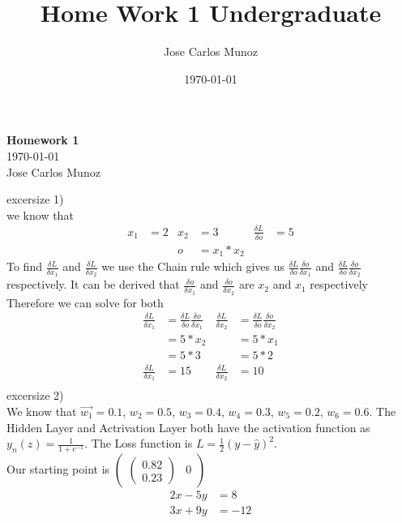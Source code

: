 \documentclass[12pt,english]{article}
\title{Home Work 1 Undergraduate}
\date{\today}
\author{Jose Carlos Munoz}
\begin{document}
\begin{center}
    \Large
    \textbf{Homework 1}\\
    \small
    \today\\
    \large
    Jose Carlos Munoz
\end{center}
excersize 1)\\
we know that
\begin{align*}
x_1&=2 & x_2&= 3 & \frac{\delta L}{\delta o}&=5\\
     &     & o   &= x_1 * x_2 
\end{align*}
To find $\frac{\delta L}{\delta x_1}$ and $\frac{\delta L}{\delta x_2}$ we use the Chain rule which gives us $\frac{\delta L}{\delta o}\frac{\delta o}{\delta x_1}$ and $\frac{\delta L}{\delta o}\frac{\delta o}{\delta x_2}$ respectively. It can be derived that $\frac{\delta o}{\delta x_1}$ and $\frac{\delta o}{\delta x_2}$ are $x_2$ and $x_1$ respectively\\
Therefore we can solve for both\\
\begin{align*}
\frac{\delta L}{\delta x_1}&=\frac{\delta L}{\delta o}\frac{\delta o}{\delta x_1} & \frac{\delta L}{\delta x_2}&=\frac{\delta L}{\delta o}\frac{\delta o}{\delta x_2}\\
                                      &=5*x_2  &  &=5 *x_1\\
                                      &=5*3  &  &=5 *2\\
\frac{\delta L}{\delta x_1}&=15  &  \frac{\delta L}{\delta x_2}&=10\\
\end{align*}
excersize 2)\\
We know that $\vec{w_1} = 0.1$, $w_2 = 0.5$, $w_3 = 0.4$, $w_4 = 0.3$, $w_5 = 0.2$, $w_6 = 0.6$. The Hidden Layer and Actrivation Layer both have the activation function as $y_n(z) = \frac{1}{1 + e^{-1}}$. The Loss function is $L = \frac{1}{2} (y - \hat{y})^{2}$.\\
Our starting point is $\begin{pmatrix} \begin{pmatrix} 0.82 \\ 0.23 \end{pmatrix}  & 0 \end{pmatrix}$
\begin{align*} 
2x - 5y &=  8 \\   
3x + 9y &=  -12
\end{align*}
\end{document}
